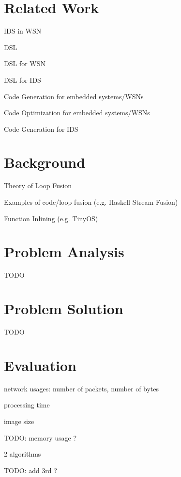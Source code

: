 \documentclass[conference]{IEEEtran}
\begin{document}
\section{Related Work}

IDS in WSN \cite{perrig2004security,mishra2004intrusion}

DSL \cite{fowler2010domain,mernik2005and}

DSL for WSN \cite{naumowicz2009prototyping,levis2004tinyscript}

DSL for IDS \cite{eckmann2002statl}

Code Generation for embedded systems/WSNs \cite{leupers2000code,marwedel2002code}

Code Optimization for embedded systems/WSNs \cite{panda2001data,naik2001software}

Code Generation for IDS \cite{charitakis2003code}

\section{Background}

Theory of Loop Fusion \cite{darte2000complexity}

Examples of code/loop fusion (e.g. Haskell Stream Fusion) \cite{coutts2007stream}

Function Inlining (e.g. TinyOS) \cite{gay2007software,gay2003nesc}

\section{Problem Analysis}

TODO

\section{Problem Solution}

TODO

\section{Evaluation}

network usages: number of packets, number of bytes

processing time

image size

TODO: memory usage ?

2 algorithms \cite{ganeriwal2008reputation}

TODO: add 3rd ? \cite{krontiris2009cooperative}
\end{document}
